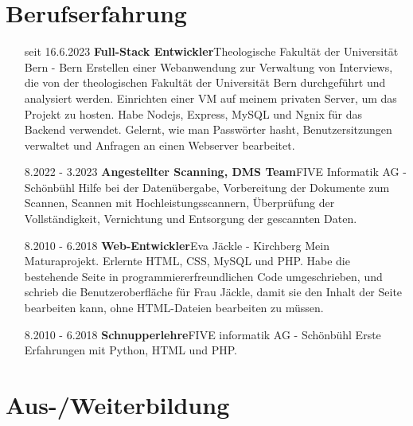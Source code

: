 \documentclass{article}
\begin{document}
\section{Berufserfahrung}
\begin{itemize}[leftmargin=3cm, labelsep = 0.5cm ]
    \item[seit 16.6.2023] \textbf{Full-Stack Entwickler}\newline Theologische Fakult\"at der Universit\"at Bern - Bern\newline
    Erstellen einer Webanwendung zur Verwaltung von Interviews, die von der theologischen Fakult\"at der Universit\"at Bern durchgef\"uhrt und analysiert werden.
    Einrichten einer VM auf meinem privaten Server, um das Projekt zu hosten. Habe Nodejs, Express, MySQL und Ngnix f\"ur das Backend verwendet.
    Gelernt, wie man Passw\"orter hasht, Benutzersitzungen verwaltet und Anfragen an einen Webserver bearbeitet.
    \item[8.2022 - 3.2023] \textbf{Angestellter Scanning, DMS Team}\newline FIVE Informatik AG - Sch\"onb\"uhl \newline
    Hilfe bei der Daten\"ubergabe, Vorbereitung der Dokumente zum Scannen, Scannen mit Hochleistungsscannern, 
    \"Uberpr\"ufung der Vollst\"andigkeit, Vernichtung und Entsorgung der gescannten Daten.
    \item[8.2010 - 6.2018] \textbf{Web-Entwickler}\newline Eva J\"ackle - Kirchberg \newline 
    Mein Maturaprojekt. Erlernte HTML, CSS, MySQL und PHP. Habe die bestehende Seite in programmiererfreundlichen Code umgeschrieben,
    und schrieb die Benutzeroberfl\"ache f\"ur Frau J\"ackle, damit sie den Inhalt der Seite bearbeiten kann,
    ohne HTML-Dateien bearbeiten zu m\"ussen.  \\
    \item[8.2010 - 6.2018] \textbf{Schnupperlehre}\newline FIVE informatik AG - Sch\"onb\"uhl \newline
    Erste Erfahrungen mit Python, HTML und PHP.\\ 
\end{itemize}

\section{Aus-/Weiterbildung}
\end{document}
